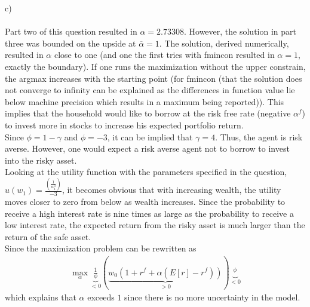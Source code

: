 \documentclass{article}
\begin{document}
c) \\ \\
Part two of this question resulted in $\alpha = 2.73308$. However, the solution in part three was bounded on the upside at $\overline{\alpha} = 1$. The solution, derived numerically, resulted in $\alpha$ close to one (and one the first tries with fmincon resulted in $\alpha  = 1$, exactly the boundary). If one runs the maximization without the upper constrain, the argmax increases with the starting point (for fmincon (that the solution does not converge to infinity can be explained as the differences in function value lie below machine precision which results in a maximum being reported)). This implies that the household would like to borrow at the risk free rate (negative $\alpha^f$) to invest more in stocks to increase his expected portfolio return. \\ Since $\phi =  1- \gamma$ and $\phi =  -3$, it can be implied that $\gamma =  4$. Thus, the agent is risk averse. However, one would expect a risk averse agent not to borrow to invest into the risky asset. \\  
Looking at the utility function with the parameters specified in the question, $u(w_1)=\frac{\left(\frac{1}{w_1^3}\right )}{-3}$, it becomes obvious that with increasing wealth, the utility moves closer to zero from below as wealth increases. Since the probability to receive a high interest rate is nine times as large as the probability to receive a low interest rate, the expected return from the risky asset is much larger than the return of the safe asset. \\ Since the maximization problem can be rewritten as
\begin{align}
\max_\alpha \underbrace{ \frac{1}{\phi}}_{<0} \left( \underbrace{ w_0 \left(1+r^f + \alpha  \left(E [ r]- r^f\right) \right)}_{>0} \right) \underbrace{^\phi}_{<0}
\end{align}
which explains that $\alpha$ exceeds $1$ since there is no more uncertainty in the model. 
\end{document}
